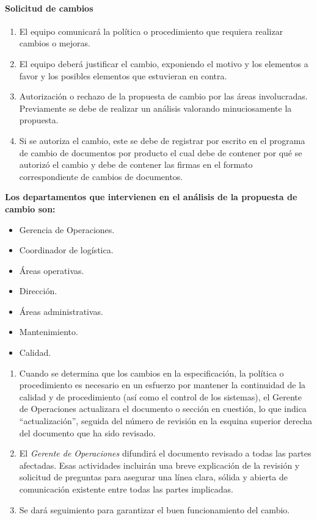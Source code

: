 \paragraph{Solicitud de cambios}
\begin{enumerate}
	\item El equipo comunicará la política o procedimiento que requiera realizar cambios o mejoras.
	\item El equipo deberá justificar el cambio, exponiendo el motivo y los elementos a favor y los posibles elementos que estuvieran en contra.
	\item Autorización o rechazo de la propuesta de cambio por las áreas involucradas. Previamente se debe de realizar un análisis valorando minuciosamente la propuesta.
	\item Si se autoriza el cambio, este se debe de registrar por escrito en el programa de cambio de documentos por producto el cual debe de contener por qué se autorizó el cambio y debe de contener las firmas en el formato correspondiente de cambios de documentos.
\end{enumerate}
	\textbf{Los departamentos que intervienen en el análisis de la propuesta de cambio son:}
		\begin{itemize}
			\item Gerencia de Operaciones.
			\item Coordinador de logística.
			\item Áreas operativas.
			\item Dirección.
			\item Áreas administrativas.
			\item Mantenimiento.
			\item Calidad.
		\end{itemize}
\begin{enumerate}[resume*]
	\item Cuando se determina que los cambios en la especificación, la política o procedimiento es necesario en un esfuerzo por mantener la continuidad de la calidad y de procedimiento (así como el control de los sistemas), el Gerente de Operaciones actualizara el documento o sección en cuestión, lo que indica “actualización”, seguida del número de revisión en la esquina superior derecha del documento que ha sido revisado.
	\item El \emph{Gerente de Operaciones} difundirá el documento revisado a todas las partes afectadas. Esas actividades incluirán una breve explicación de la revisión y solicitud de preguntas para asegurar una línea clara, sólida y abierta de comunicación existente entre todas las partes implicadas.
	\item Se dará seguimiento para garantizar el buen funcionamiento del cambio.
\end{enumerate}

